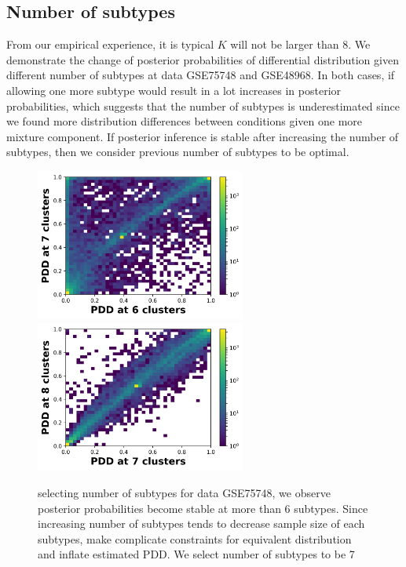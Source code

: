 \documentclass[11pt]{amsart}
\begin{document}
\subsection{Number of subtypes}
From our empirical experience, it is typical $K$ will not be larger than 8. We demonstrate the change of posterior probabilities of differential distribution given different number of subtypes at data GSE75748 and GSE48968. In both cases, if allowing one more subtype would result in a lot increases in posterior probabilities, which suggests that the number of subtypes is underestimated since we found more distribution differences between conditions given one more mixture component. If posterior inference is stable after increasing the number of subtypes, then we consider previous number of subtypes to be optimal. 
\begin{figure}[H]
  \includegraphics[height = 5cm, width=\linewidth]{Figs/DN_67.png}
\endminipage\hfill
{}
  \includegraphics[height = 5cm, width=\linewidth]{Figs/DN_78.png}
\endminipage\hfill
\caption{selecting number of subtypes for data GSE75748, we observe posterior probabilities become stable at more than 6 subtypes. Since increasing number of subtypes tends to decrease sample size of each subtypes, make complicate constraints for equivalent distribution and inflate estimated PDD.  We select number of subtypes to be 7}
\end{figure}
\end{document}
